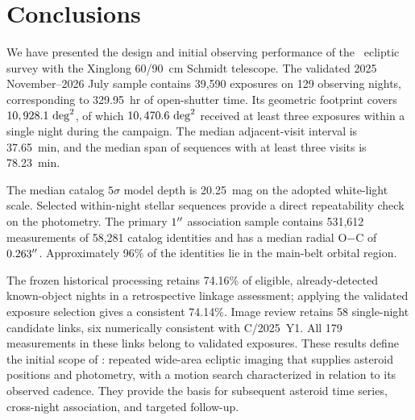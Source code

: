 \section{Conclusions}
\label{sec:conclusions}

We have presented the design and initial
observing performance of the \SHARP\
ecliptic survey with the Xinglong
60/90~cm Schmidt telescope. The
validated 2025 November--2026 July
sample contains 39,590 exposures on
129 observing nights, corresponding
to 329.95~hr of open-shutter time.
Its geometric footprint covers
$10,928.1~\mathrm{deg}^{2}$, of which
$10,470.6~\mathrm{deg}^{2}$ received at least
three exposures within a single
night during the campaign. The
median adjacent-visit interval is
37.65~min, and the median span of
sequences with at least three
visits is 78.23~min.

The median catalog $5\sigma$ model
depth is 20.25~mag on the adopted
white-light scale. Selected
within-night stellar sequences
provide a direct repeatability
check on the photometry. The
primary $1^{\prime\prime}$ association
sample contains 531,612
measurements of 58,281 catalog
identities and has a median
radial O$-$C of $0.263^{\prime\prime}$.
Approximately 96\% of the
identities lie in the main-belt
orbital region.

The frozen historical processing
retains 74.16\% of eligible,
already-detected known-object
nights in a retrospective
linkage assessment; applying the validated exposure selection gives
a consistent 74.14\%. Image review retains 58
single-night candidate links,
six numerically consistent with C/2025~Y1. All 179 measurements in these
links belong to validated exposures. These results
define the initial scope of
\SHARP: repeated wide-area
ecliptic imaging that supplies
asteroid positions and
photometry, with a motion
search characterized in
relation to its observed
cadence. They provide the
basis for subsequent asteroid
time series, cross-night
association, and targeted
follow-up.
